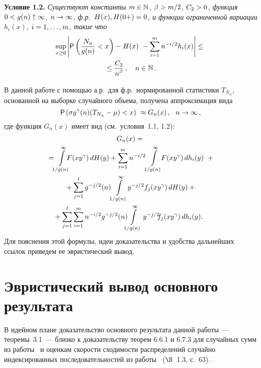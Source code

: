 \begin{multicols}{2}
\smallskip

\noindent
\textbf{Условие 1.2.} \textit{Существуют константы  $m\hm\in\N$, $\beta\hm>m/2$,
$C_2\hm>0$, функция $0\hm<g(n)\uparrow \infty$, $n\hm\to\infty$, ф.р.~$H(x),
H(0+)\hm=0$, и функции ограниченной вариации $h_i(x)$, $i\hm=1,\ldots ,m$, такие
что}
\begin{multline*}
\sup\limits_{x\ge0} \left|{{\sf P}}\left(\displaystyle\frac{\displaystyle N_n\mathstrut}{\displaystyle g(n)\mathstrut} < x\right) - H(x)\ -
\sum\limits_{i=1}^m n^{-i/2} h_i(x) \right|  \leq{}\\
{}\leq \displaystyle\frac{\displaystyle C_2\mathstrut}{\displaystyle n^{\beta}\mathstrut}\,, \ \
\  n\in\mathbb N\,.
\end{multline*}

\smallskip

В данной работе с помощью а.р.\ для ф.р.\ нормированной статистики
$T_{N_n}$, основанной на выборке случайного объема, получена
аппроксимация вида
\begin{equation*}
{{\sf P}}\left(\sigma g^\gamma(n)(T_{N_n}  -  \mu)  <  x\right)\ \approx
G_{n}(x)\,, \ \  n \to \infty\,,
\end{equation*}
где функция $G_n(x)$ имеет вид (см.\ условия~1.1, 1.2):
\begin{multline}
G_n(x) = {}\\
{}=\!\!\int\limits_{1/g(n)}^\infty\!\!\!\! F(x y^\gamma)\, dH(y) +
\sum\limits_{i=1}^m n^{-i/2}\! \int\limits_{1/g(n)}^\infty \!\!F(xy^\gamma)\,
dh_i(y)\ +{}
\\
{}+ \sum\limits_{j=1}^l g^{-j/2}(n)\! \int\limits_{1/g(n)}^\infty \!
y^{-j/2}f_j(xy^\gamma)\, dH(y) +{}\\
\hspace*{-3mm}{}+
\sum\limits_{j=1}^l \sum\limits_{i=1}^m n^{-i/2}g^{-j/2}(n)
\!\!\!\int\limits_{1/g(n)}^\infty y^{-j/2}\!\!f_j(xy^\gamma)
\,dh_i(y).\!
\label{e1.2-ben}
\end{multline}
Для пояснения этой формулы, идеи доказательства и удобства
дальнейших ссылок приведем ее эвристический вывод.

\section{Эвристический вывод основного результата}

В идейном плане доказательство основного результата данной работы~---
теоремы~3.1~--- близко к доказательству теорем 6.6.1 и 6.7.3 для
случайных сумм из работы~\cite{6-ben} и оценкам скорости сходимости
распределений случайно индексированных последовательностей из работы~\cite{14-ben} 
($\S$~1.3, с.~63).


\end{multicols}
